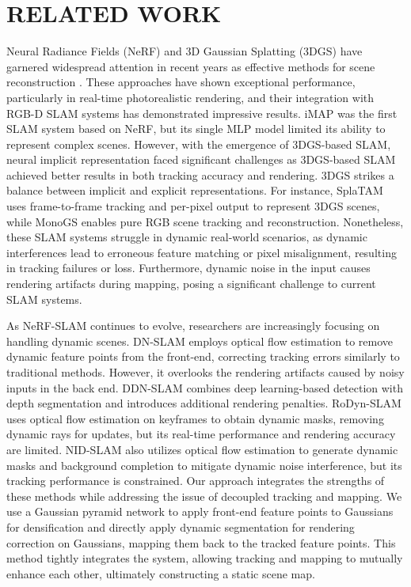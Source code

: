 \section{RELATED WORK}
Neural Radiance Fields (NeRF) \cite{12} and 3D Gaussian Splatting (3DGS) \cite{13} have garnered widespread attention in recent years as effective methods for scene reconstruction \cite{deng2024plgslam,deng2024neslam,zhu2022nice,johari2023eslam,wang2023co}. These approaches have shown exceptional performance, particularly in real-time photorealistic rendering, and their integration with RGB-D SLAM systems has demonstrated impressive results. iMAP \cite{14} was the first SLAM system based on NeRF, but its single MLP model limited its ability to represent complex scenes. However, with the emergence of 3DGS-based SLAM, neural implicit representation faced significant challenges as 3DGS-based SLAM achieved better results in both tracking accuracy and rendering. 3DGS strikes a balance between implicit and explicit representations. For instance, SplaTAM \cite{4} uses frame-to-frame tracking and per-pixel output to represent 3DGS scenes, while MonoGS \cite{2} enables pure RGB scene tracking and reconstruction. Nonetheless, these SLAM systems struggle in dynamic real-world scenarios, as dynamic interferences lead to erroneous feature matching or pixel misalignment, resulting in tracking failures or loss. Furthermore, dynamic noise in the input causes rendering artifacts during mapping, posing a significant challenge to current SLAM systems.

As NeRF-SLAM continues to evolve, researchers are increasingly focusing on handling dynamic scenes. DN-SLAM \cite{7} employs optical flow estimation to remove dynamic feature points from the front-end, correcting tracking errors similarly to traditional methods. However, it overlooks the rendering artifacts caused by noisy inputs in the back end. DDN-SLAM \cite{DDN} combines deep learning-based detection with depth segmentation and introduces additional rendering penalties. RoDyn-SLAM \cite{10} uses optical flow estimation on keyframes to obtain dynamic masks, removing dynamic rays for updates, but its real-time performance and rendering accuracy are limited. NID-SLAM \cite{8} also utilizes optical flow estimation to generate dynamic masks and background completion to mitigate dynamic noise interference, but its tracking performance is constrained. Our approach integrates the strengths of these methods while addressing the issue of decoupled tracking and mapping. We use a Gaussian pyramid network to apply front-end feature points to Gaussians for densification and directly apply dynamic segmentation for rendering correction on Gaussians, mapping them back to the tracked feature points. This method tightly integrates the system, allowing tracking and mapping to mutually enhance each other, ultimately constructing a static scene map.

